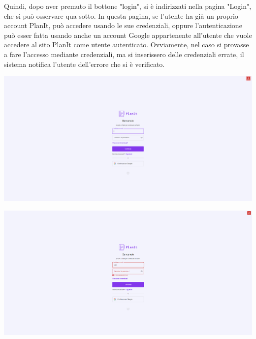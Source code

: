 Quindi, dopo aver premuto il bottone "login", si è indirizzati nella pagina "Login", che si può osservare qua sotto. In questa pagina, se l'utente ha già un proprio account PlanIt, può accedere usando le sue credenziali, oppure l'autenticazione può esser fatta usando anche un account Google appartenente all'utente che vuole accedere al sito PlanIt come utente autenticato. Ovviamente, nel caso si provasse a fare l'accesso mediante credenziali, ma si inserissero delle credenziali errate, il sistema notifica l'utente dell'errore che si è verificato.
\begin{center}
    \includegraphics[width=1\textwidth, height=0.3\textheight]{img/png/FrontEnd/Homepage_Autenticazione/login.png}
\end{center}

\begin{center}
    \includegraphics[width=1\textwidth, height=0.3\textheight]{img/png/FrontEnd/Homepage_Autenticazione/login_errato.png}
\end{center}


